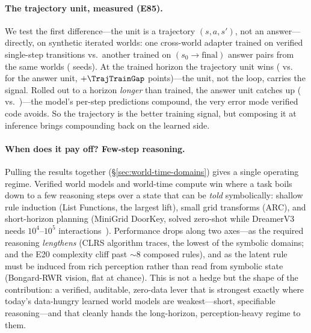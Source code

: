 \documentclass[11pt]{article}
\begin{document}
\paragraph{The trajectory unit, measured (E85).} We test the first difference---the unit is a
trajectory $(s,a,s')$, not an answer---directly, on synthetic iterated worlds: one
cross-world adapter trained on verified single-step transitions vs.\ another trained on
$(s_0\!\to\!\text{final})$ answer pairs from the same worlds (\TrajNSeeds{} seeds). At the
trained horizon the trajectory unit wins (\TrajTrainTraj{} vs.\ \TrajTrainAnswer{} for the answer
unit, $+\TrajTrainGap$ points)---the unit, not the loop, carries the signal. Rolled out to a
horizon \emph{longer} than trained, the answer unit catches up (\TrajLongAnswer{} vs.\
\TrajLongTraj)---the model's per-step predictions compound, the very error mode verified
code avoids. So the trajectory is the better training signal, but composing it at inference
brings compounding back on the learned side.

\paragraph{When does it pay off? Few-step reasoning.} Pulling the results together
(\S\ref{sec:world-time-domains}) gives a single operating regime. Verified world models and
world-time compute win where a task boils down to a few reasoning steps over a state that can
be \emph{told} symbolically: shallow rule induction (List Functions, the largest lift), small
grid transforms (ARC), and short-horizon planning (MiniGrid DoorKey, solved zero-shot while
DreamerV3 needs $10^4$--$10^5$ interactions~\cite{dreamerv3}). Performance drops along two axes---as the
required reasoning \emph{lengthens} (CLRS algorithm traces, the lowest of the symbolic domains;
and the E20 complexity cliff past $\sim$8 composed rules), and as the latent rule must be
induced from rich perception rather than read from symbolic state (Bongard-RWR vision,
flat at chance). This is not a hedge but the shape of the contribution: a verified, auditable,
zero-data lever that is strongest exactly where today's data-hungry learned world models are
weakest---short, specifiable reasoning---and that cleanly hands the long-horizon, perception-heavy
regime to them.
\end{document}
